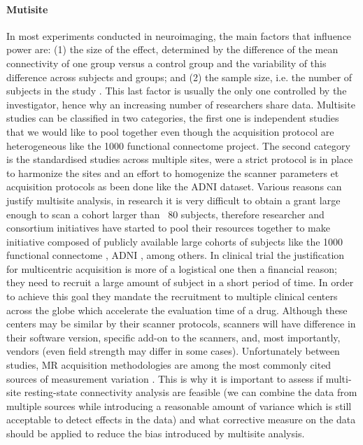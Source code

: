 \documentclass[authoryear]{elsarticle}
\begin{document}
\paragraph{Mutisite}
In most experiments conducted in neuroimaging, the main factors that influence power are: (1) the size of the effect, determined by the difference of the mean connectivity of one group versus a control group and the variability of this difference across subjects and groups; and (2) the sample size, i.e. the number of subjects in the study \citep{Desmond2002}. This last factor is usually the only one controlled by the investigator, hence why an increasing number of researchers share data. Multisite studies can be classified in two categories, the first one is independent studies that we would like to pool together even though the acquisition protocol are heterogeneous like the 1000 functional connectome project. The second category is the standardised studies across multiple sites, were a strict protocol is in place to harmonize the sites and an effort to homogenize the scanner parameters et acquisition protocols as been done like the ADNI dataset. Various reasons can justify multisite analysis, in research it is very difficult to obtain a grant large enough to scan a cohort larger than ~80 subjects, therefore researcher and consortium initiatives have started to pool their resources together to make initiative composed of publicly available large cohorts of subjects like the 1000 functional connectome \citep{Biswal2010}, ADNI \citep{Mueller2005}, among 
others. In clinical trial the justification for multicentric acquisition is more of a logistical one then a financial reason; they need to recruit a large amount of subject in a short period of time. In order to achieve this goal they mandate the recruitment to multiple clinical centers across the globe which accelerate the evaluation time of a drug. Although these centers may be similar by their scanner protocols, scanners will have difference in their software version, specific add-on to the scanners, and, most importantly, vendors (even field strength may differ in some cases). Unfortunately between studies, MR acquisition methodologies are among the most commonly cited sources of measurement variation \citep{Friedman2006}. This is why it is important to assess if multi-site resting-state connectivity analysis are feasible (we can combine the data from multiple sources while introducing a reasonable amount of variance which is still acceptable to detect effects in the data) and what corrective measure on the data should be applied to reduce the bias introduced by multisite analysis. 
\end{document}
